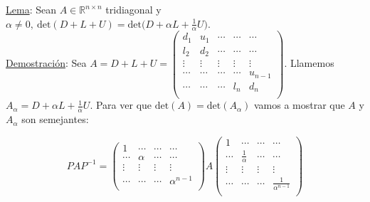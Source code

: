 \underline{Lema}: Sean $A \in \mathbb{R}^{n \times n}$ tridiagonal y $\alpha \neq 0,\ \text{det}(D + L + U) = \text{det}\bigg(D + \alpha L  + \frac{1}{\alpha}U \bigg)$.\\

\underline{Demostraci\'on}: Sea $ A = D + L + U = 
	\begin{pmatrix}
        d_{1} & u_{1} & \cdots & \cdots & \cdots\\
        l_{2} & d_{2} & \cdots & \cdots & \cdots\\
        \vdots & \vdots & \vdots & \vdots & \vdots\\
        \cdots & \cdots & \cdots & \cdots & u_{n - 1}\\
        \cdots & \cdots & \cdots & l_{n} & d_{n}\\
	\end{pmatrix}
$. Llamemos $A_{\alpha} = D + \alpha L  + \frac{1}{\alpha}U$. Para ver que $\text{det}(A) = \text{det}(A_{\alpha})$ vamos a mostrar que $A$ y $A_{\alpha}$ son semejantes:

$$ PAP^{-1} = 
	\begin{pmatrix}
        1 & \cdots & \cdots & \cdots\\
        \cdots & \alpha & \cdots & \cdots\\
        \vdots & \vdots & \vdots & \vdots\\
        \cdots & \cdots & \cdots & \alpha^{n - 1}\\
	\end{pmatrix}
	A
	\begin{pmatrix}
        1 & \cdots & \cdots & \cdots\\
        \cdots & \frac{1}{\alpha} & \cdots & \cdots\\
        \vdots & \vdots & \vdots & \vdots\\
        \cdots & \cdots & \cdots & \frac{1}{\alpha^{n - 1}}\\
	\end{pmatrix}
$$

